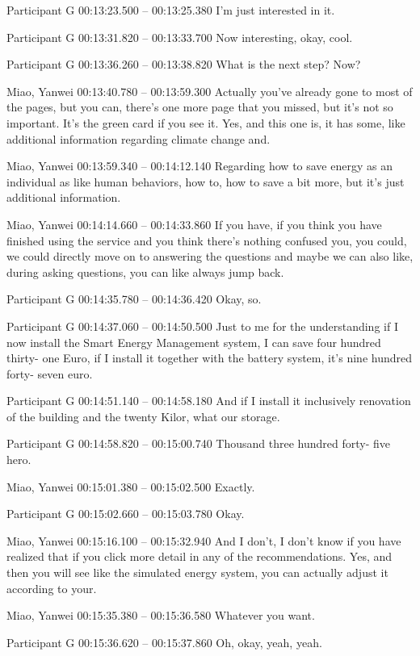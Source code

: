 {Participant G 00:13:23.500 -- 00:13:25.380
I'm just interested in it.

Participant G 00:13:31.820 -- 00:13:33.700
Now interesting, okay, cool.

Participant G 00:13:36.260 -- 00:13:38.820
What is the next step? Now?

Miao, Yanwei 00:13:40.780 -- 00:13:59.300
Actually you've already gone to most of the pages, but you can, there's one more page that you missed, but it's not so important. It's the green card if you see it. Yes, and this one is, it has some, like additional information regarding climate change and.

Miao, Yanwei 00:13:59.340 -- 00:14:12.140
Regarding how to save energy as an individual as like human behaviors, how to, how to save a bit more, but it's just additional information.

Miao, Yanwei 00:14:14.660 -- 00:14:33.860
If you have, if you think you have finished using the service and you think there's nothing confused you, you could, we could directly move on to answering the questions and maybe we can also like, during asking questions, you can like always jump back.

Participant G 00:14:35.780 -- 00:14:36.420
Okay, so.

Participant G 00:14:37.060 -- 00:14:50.500
Just to me for the understanding if I now install the Smart Energy Management system, I can save four hundred thirty- one Euro, if I install it together with the battery system, it's nine hundred forty- seven euro.

Participant G 00:14:51.140 -- 00:14:58.180
And if I install it inclusively renovation of the building and the twenty Kilor, what our storage.

Participant G 00:14:58.820 -- 00:15:00.740
Thousand three hundred forty- five hero.

Miao, Yanwei 00:15:01.380 -- 00:15:02.500
Exactly.

Participant G 00:15:02.660 -- 00:15:03.780
Okay.

Miao, Yanwei 00:15:16.100 -- 00:15:32.940
And I don't, I don't know if you have realized that if you click more detail in any of the recommendations. Yes, and then you will see like the simulated energy system, you can actually adjust it according to your.

Miao, Yanwei 00:15:35.380 -- 00:15:36.580
Whatever you want.

Participant G 00:15:36.620 -- 00:15:37.860
Oh, okay, yeah, yeah.

}
